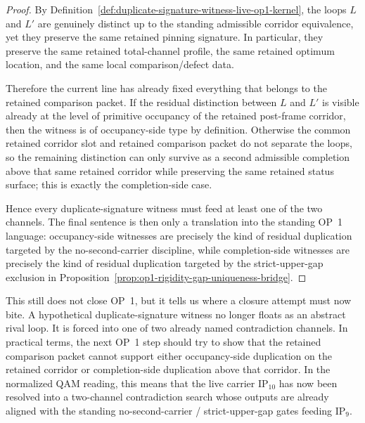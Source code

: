 \begin{proof}
By Definition~\ref{def:duplicate-signature-witness-live-op1-kernel}, the loops $L$ and $L'$ are genuinely distinct up to the standing admissible corridor equivalence, yet they preserve the same retained pinning signature. In particular, they preserve the same retained total-channel profile, the same retained optimum location, and the same local comparison/defect data.

Therefore the current line has already fixed everything that belongs to the retained comparison packet. If the residual distinction between $L$ and $L'$ is visible already at the level of primitive occupancy of the retained post-frame corridor, then the witness is of occupancy-side type by definition. Otherwise the common retained corridor slot and retained comparison packet do not separate the loops, so the remaining distinction can only survive as a second admissible completion above that same retained corridor while preserving the same retained status surface; this is exactly the completion-side case.

Hence every duplicate-signature witness must feed at least one of the two channels. The final sentence is then only a translation into the standing OP~1 language: occupancy-side witnesses are precisely the kind of residual duplication targeted by the no-second-carrier discipline, while completion-side witnesses are precisely the kind of residual duplication targeted by the strict-upper-gap exclusion in Proposition~\ref{prop:op1-rigidity-gap-uniqueness-bridge}.
\end{proof}

\begin{remark}
\label{rem:what-contradiction-split-buys-next-op1-attack}
This still does not close OP~1, but it tells us where a closure attempt must now bite. A hypothetical duplicate-signature witness no longer floats as an abstract rival loop. It is forced into one of two already named contradiction channels. In practical terms, the next OP~1 step should try to show that the retained comparison packet cannot support either occupancy-side duplication on the retained corridor or completion-side duplication above that corridor. In the normalized QAM reading, this means that the live carrier \(\mathrm{IP}_{10}\) has now been resolved into a two-channel contradiction search whose outputs are already aligned with the standing no-second-carrier / strict-upper-gap gates feeding \(\mathrm{IP}_9\).
\end{remark}



